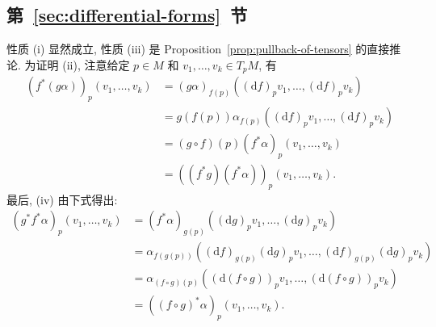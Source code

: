 \subsection{\texorpdfstring{第~\ref{sec:differential-forms}~节}{微分形式}}\label{subsec:solutions-pullback-and-exterior-derivative}

\begin{description}[font=\normalfont,leftmargin=2em,labelwidth=1.5em]
性质 (i) 显然成立, 性质 (iii) 是 Proposition~\ref{prop:pullback-of-tensors} 的直接推论. 为证明 (ii), 注意给定 $p\in M$ 和 $v_1,\ldots,v_k\in T_pM$, 有
\begin{align*}
  (f^*(g\alpha))_p(v_1,\ldots,v_k)
  &=(g\alpha)_{f(p)}((\mathrm{d}f)_pv_1,\ldots,(\mathrm{d}f)_pv_k)\\
  &=g(f(p))\alpha_{f(p)}((\mathrm{d}f)_pv_1,\ldots,(\mathrm{d}f)_pv_k)\\
  &=(g\circ f)(p)(f^*\alpha)_p(v_1,\ldots,v_k)\\
  &=((f^*g)(f^*\alpha))_p(v_1,\ldots,v_k).
\end{align*}
最后, (iv) 由下式得出:
\begin{align*}
  (g^*f^*\alpha)_p(v_1,\ldots,v_k)
  &=(f^*\alpha)_{g(p)}((\mathrm{d}g)_pv_1,\ldots,(\mathrm{d}g)_pv_k)\\
  &=\alpha_{f(g(p))}((\mathrm{d}f)_{g(p)}(\mathrm{d}g)_pv_1,\ldots,
                          (\mathrm{d}f)_{g(p)}(\mathrm{d}g)_pv_k)\\
  &=\alpha_{(f\circ g)(p)}((\mathrm{d}(f\circ g))_pv_1,\ldots,(\mathrm{d}(f\circ g))_pv_k)\\
  &=((f\circ g)^*\alpha)_p(v_1,\ldots,v_k).
\end{align*}


\end{description}
